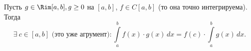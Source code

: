 
 		Пусть $g\in\Rim[a,b],g\geq0$ на $[a,b]$, $f\in C[a,b]$ (то она точно интегрируема). Тогда
 		$$\exists\  c\in[a,b]\text{ (это уже агрумент)}\colon\int\limits_a^bf(x)\cdot g(x)\,dx=f(c)\cdot\int\limits_a^bg(x)\,dx.$$
 	